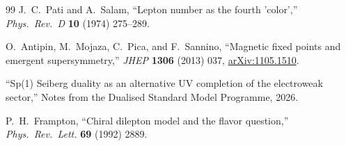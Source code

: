 \documentclass[11pt,a4paper]{article}
\theoremstyle{plain}
\theoremstyle{definition}
\theoremstyle{remark}
\begin{document}
\begin{thebibliography}{99}
J.~C.~Pati and A.~Salam,
``Lepton number as the fourth 'color',''
\textit{Phys.\ Rev.\ D} \textbf{10} (1974) 275--289.

O.~Antipin, M.~Mojaza, C.~Pica, and F.~Sannino,
``Magnetic fixed points and emergent supersymmetry,''
\textit{JHEP} \textbf{1306} (2013) 037,
\href{https://arxiv.org/abs/1105.1510}{arXiv:1105.1510}.

``Sp(1) Seiberg duality as an alternative UV completion of the
electroweak sector,''
Notes from the Dualised Standard Model Programme, 2026.

P.~H.~Frampton,
``Chiral dilepton model and the flavor question,''
\textit{Phys.\ Rev.\ Lett.} \textbf{69} (1992) 2889.

\end{thebibliography}
\end{document}
